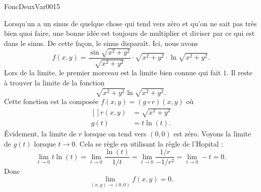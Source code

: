 

\begin{corrige}{FoncDeuxVar0015}

	Lorsqu'un a un sinus de quelque chose qui tend vers zéro et qu'on ne sait pas très bien quoi faire, une bonne idée est toujours de multiplier et diviser par ce qui est dans le sinus. De cette façon, le sinus disparaît. Ici, nous avons
	\begin{equation}
		f(x,y)=\frac{ \sin\sqrt{x^2+y^2} }{ \sqrt{x^2+y^2} }\cdot\sqrt{x^2+y^2}\cdot\ln\sqrt{x^2+y^2}.
	\end{equation}
	Lors de la limite, le premier morceau est la limite bien connue qui fait $1$. Il reste à trouver la limite de la fonction
	\begin{equation}
		\sqrt{x^2+y^2}\ln\sqrt{x^2+y^2}.
	\end{equation}
	Cette fonction est la composée $f(x,y)=(g\circ r)(x,y)$ où
	\begin{equation}
		\begin{aligned}[]
			r(x,y)&=\sqrt{x^2+y^2}\\
			g(t)&=t\ln(t).
		\end{aligned}
	\end{equation}
	Évidement, la limite de $r$ lorsque on tend vers $(0,0)$ est zéro. Voyons la limite de $g(t)$ lorsque $t\to 0$. Cela se règle en utilisant la règle de l'Hopital :
	\begin{equation}
		\lim_{t\to 0}t\ln(t)=\lim_{t\to 0}\frac{ \ln(t) }{ 1/t }=\lim_{t\to 0}\frac{ 1/r }{ -1/r^2 }=\lim_{t\to0}-t=0.
	\end{equation}
	Donc
	\begin{equation}
		\lim_{(x,y)\to(0,0)}f(x,y)=0.
	\end{equation}

\end{corrige}
